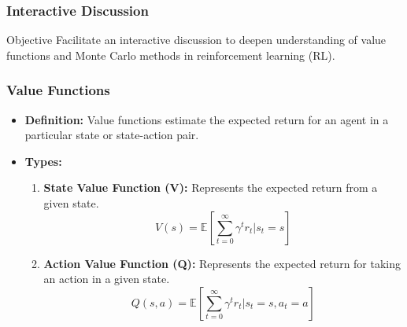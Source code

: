 \documentclass[aspectratio=169]{beamer}
\begin{document}
\begin{frame}[fragile]
    \frametitle{Interactive Discussion}
    \begin{block}{Objective}
        Facilitate an interactive discussion to deepen understanding of value functions and Monte Carlo methods in reinforcement learning (RL).
    \end{block}
\end{frame}

\begin{frame}[fragile]
    \frametitle{Value Functions}
    \begin{itemize}
        \item \textbf{Definition:} Value functions estimate the expected return for an agent in a particular state or state-action pair. 
        \item \textbf{Types:}
        \begin{enumerate}
            \item \textbf{State Value Function (V):} Represents the expected return from a given state.
            \begin{equation}
            V(s) = \mathbb{E}[\sum_{t=0}^{\infty} \gamma^t r_t | s_t = s]
            \end{equation}
            \item \textbf{Action Value Function (Q):} Represents the expected return for taking an action in a given state.
            \begin{equation}
            Q(s, a) = \mathbb{E}[\sum_{t=0}^{\infty} \gamma^t r_t | s_t = s, a_t = a]
            \end{equation}
        \end{enumerate}
    \end{itemize}
\end{frame}
\end{document}

